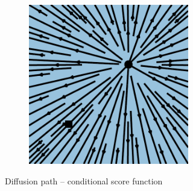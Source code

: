 \documentclass{article}
\begin{document}
\begin{figure}
\begin{subfigure}[t]{0.42\linewidth}
\begin{subfigure}[t]{0.23\linewidth}
        \vspace{-1.5em}
        \caption*{}
    \end{subfigure}
    \begin{subfigure}[t]{0.23\linewidth}
        \centering
        \includegraphics[width=\linewidth]{figures/plots/2d_vf_score_dif_3.pdf}
        \vspace{-1.5em}
        \caption*{}
    \end{subfigure} \vspace{-5pt}
\caption*{Diffusion path -- conditional score function}
\end{subfigure} 
\hfill
\begin{subfigure}[t]{0.43\linewidth}
\centering
    \begin{subfigure}[t]{0.23\linewidth}
        \centering

\end{subfigure}
\end{subfigure}
\end{figure}
\end{document}

